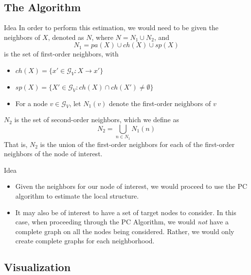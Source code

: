 \documentclass{beamer}
\begin{document}
\subsection{The Algorithm}

\begin{frame}{Idea}
In order to perform this estimation, we would need to be given the neighbors of $X$, denoted as $N$, where $N = N_1 \cup N_2$, and 
$$ N_1 = pa(X) \cup ch(X) \cup sp(X) $$
is the set of first-order neighbors, with 
\begin{itemize}
\item $ch(X) = \{x' \in \mathcal{G}_V: X \rightarrow x' \}$ 
\item $sp(X) = \{X' \in \mathcal{G}_V: ch(X) \cap ch(X') \neq \emptyset \}$
\item For a node $v \in \mathcal{G}_V$, let $N_1(v)$ denote the first-order neighbors of $v$
\end{itemize}
$N_2$ is the set of second-order neighbors, which we define as
$$ N_2 = \bigcup_{n \in N_1} N_1(n) $$
That is, $N_2$ is the union of the first-order neighbors for each of the first-order neighbors of the node of interest.
\end{frame}

\begin{frame}{Idea}
\begin{itemize}
\item Given the neighbors for our node of interest, we would proceed to use the PC algorithm to estimate the local structure. 
\item It may also be of interest to have a set of target nodes to consider. In this case, when proceeding through the PC Algorithm, we would \textit{not} have a complete graph on all the nodes being considered. Rather, we would only create complete graphs for each neighborhood.
\end{itemize}
\end{frame}


\subsection{Visualization}
\end{document}
